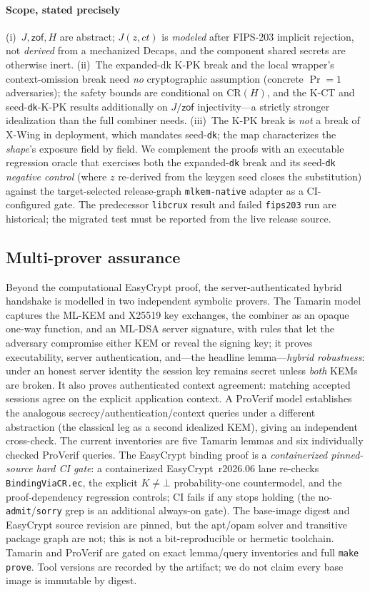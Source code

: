 \documentclass[journal]{IEEEtran}
\newcommand{\code}[1]{\texttt{\small #1}}
\newcommand{\K}{\ensuremath{K}}
\begin{document}
\paragraph*{Scope, stated precisely} (i)~$J,\mathsf{zof},H$ are abstract; $J(z,ct)$ is
\emph{modeled} after FIPS-203 implicit rejection, not \emph{derived} from a mechanized Decaps, and
the component shared secrets are otherwise inert. (ii)~The expanded-dk K-PK break and the local
wrapper's context-omission break need \emph{no} cryptographic assumption (concrete $\Pr{=}1$
adversaries); the safety bounds are conditional on
$\mathrm{CR}(H)$, and the \mbox{K-CT} and seed-\code{dk}-\mbox{K-PK} results additionally on
$J/\mathsf{zof}$ injectivity---a strictly stronger idealization than the full combiner needs.
(iii)~The K-PK break is \emph{not} a break of X-Wing in deployment, which mandates seed-\code{dk};
the map characterizes the \emph{shape}'s exposure field by field. We complement the proofs with an
executable regression oracle that exercises both the expanded-\code{dk} break and its seed-\code{dk}
\emph{negative control} (where $z$ re-derived from the keygen seed closes the substitution) against
the target-selected release-graph \code{mlkem-native} adapter as a CI-configured gate. The predecessor
\code{libcrux} result and failed \code{fips203} run are historical; the migrated test must be
reported from the live release source.

\subsection{Multi-prover assurance}
Beyond the computational EasyCrypt proof, the server-authenticated hybrid handshake is modelled in
two independent symbolic provers. The Tamarin model captures the ML-KEM and X25519 key exchanges,
the combiner as an opaque one-way function, and an ML-DSA server signature, with rules that let the
adversary compromise either KEM or reveal the signing key; it proves executability, server
authentication, and---the headline lemma---\emph{hybrid robustness}: under an honest server identity
the session key remains secret unless \emph{both} KEMs are broken. It also proves authenticated
context agreement: matching accepted sessions agree on the explicit application context. A ProVerif
model establishes the analogous secrecy/authentication/context queries under a different abstraction
(the classical leg as a second idealized KEM), giving an independent cross-check. The current
inventories are five Tamarin lemmas and six individually checked ProVerif queries. The EasyCrypt
binding proof is a \emph{containerized pinned-source hard CI gate}: a containerized
EasyCrypt~r2026.06 lane re-checks
\code{BindingViaCR.ec}, the explicit $\K\neq\bot$ probability-one countermodel, and the
proof-dependency regression controls; CI fails if any stops holding (the no-\code{admit}/\code{sorry}
grep is an additional always-on gate). The base-image digest and EasyCrypt source revision are
pinned, but the apt/opam solver and transitive package graph are not; this is not a bit-reproducible
or hermetic toolchain. Tamarin and ProVerif are gated on exact lemma/query inventories
and full \code{make prove}. Tool versions are recorded by the artifact; we do not claim every base
image is immutable by digest.
\end{document}
